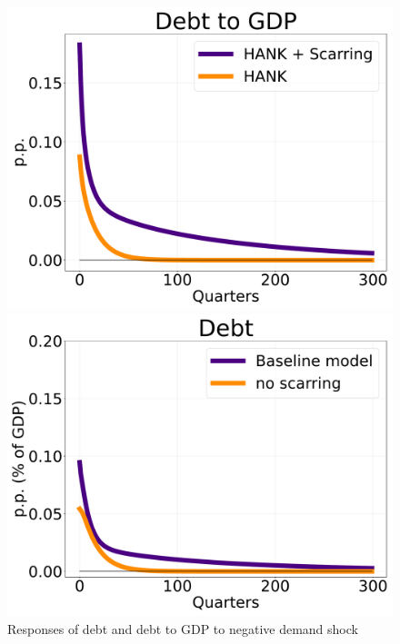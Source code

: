 \begin{figure}[!h]
    \centering
   \begin{minipage}{0.47\textwidth}
        \centering
        \includegraphics[scale=.2]{text/chapter1/Figures/IPRs_discfac/debt_to_GDP_IPR} %
    \end{minipage}\hfill
    \begin{minipage}{0.47\textwidth}
        \centering
        \includegraphics[scale=.2]{text/chapter1/Figures/IPRs_discfac/debt_IPR} %
    \end{minipage}
    \caption{Responses of debt and debt to GDP to negative demand shock}
    \label{debt_to_GDP}
\end{figure}


